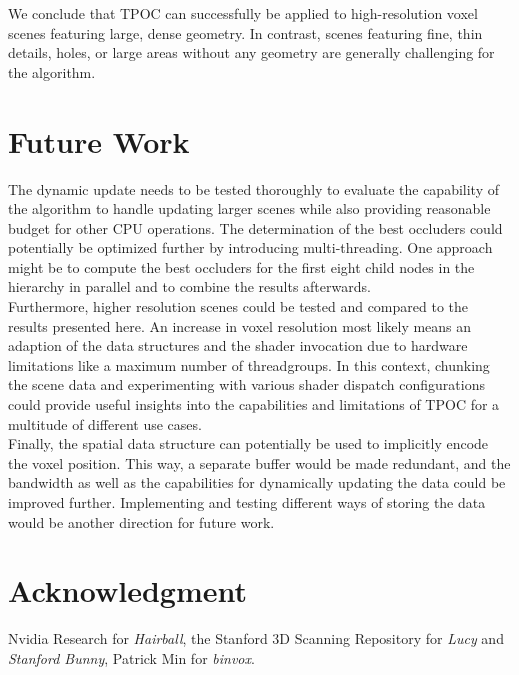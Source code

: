 \documentclass[conference]{IEEEtran}
\begin{document}
\noindent
We conclude that \ac{TPOC} can successfully be applied to high-resolution voxel scenes featuring large, dense 
geometry. In contrast, scenes featuring fine, thin details, holes, or large areas without any geometry are 
generally challenging for the algorithm.

\section{Future Work} \label{sec-future-work}

\noindent
The dynamic update needs to be tested thoroughly to evaluate the capability of the algorithm to handle updating 
larger scenes while also providing reasonable budget for other \ac{CPU} operations. The determination of the best 
occluders could potentially be optimized further by introducing multi-threading. One approach might be to 
compute the best occluders for the first eight child nodes in the hierarchy in parallel and to combine the results 
afterwards. \\

\noindent
Furthermore, higher resolution scenes could be tested and compared to the results presented here. An increase in 
voxel resolution most likely means an adaption of the data structures and the shader invocation due to hardware 
limitations like a maximum number of threadgroups. In this context, chunking the scene data and experimenting with 
various shader dispatch configurations could provide useful insights into the capabilities and limitations of 
\ac{TPOC} for a multitude of different use cases. \\

\noindent
Finally, the spatial data structure can potentially be used to implicitly encode the voxel position. This way, 
a separate buffer would be made redundant, and the bandwidth as well as the capabilities for dynamically updating 
the data could be improved further. Implementing and testing different ways of storing the data would be another 
direction for future work.

\section*{Acknowledgment} \label{section-acknowledgment}

\noindent
Nvidia Research for \emph{Hairball}, the Stanford 3D Scanning Repository for \emph{Lucy} 
and \emph{Stanford Bunny}, Patrick Min for \emph{binvox}.
\end{document}
